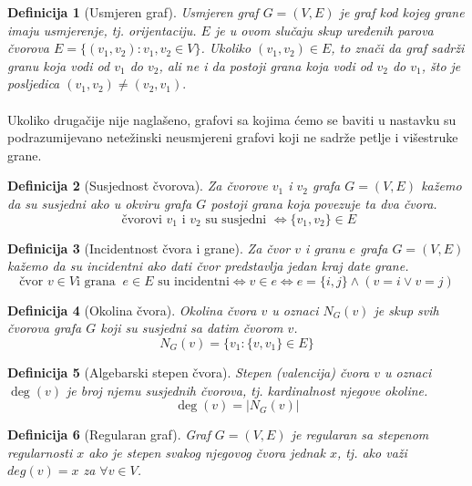 \documentclass[11pt]{article}
\newtheorem{definition}{Definicija}
\begin{document}
		\begin{definition}[Usmjeren graf]
		Usmjeren graf $G =(V,E)$ je graf kod kojeg grane imaju usmjerenje, tj. orijentaciju. $E$ je u ovom slučaju skup uređenih parova čvorova $E = \{ (v_1,v_2) : v_1, v_2 \in V\}$. 
		Ukoliko $(v_1,v_2) \in E$, to znači da graf sadrži granu koja vodi od $v_1$ do $v_2$, ali ne i da postoji grana koja vodi od $v_2$ do $v_1$, što je posljedica $(v_1,v_2) \neq (v_2,v_1).$
		\end{definition}
	
		\paragraph{}
		Ukoliko drugačije nije naglašeno, grafovi sa kojima ćemo se baviti u nastavku su podrazumijevano netežinski neusmjereni grafovi koji ne sadrže petlje i višestruke grane.
	
		\begin{definition}[Susjednost čvorova]
		Za čvorove $v_1$ i $v_2$ grafa $G = (V, E)$ kažemo da su susjedni ako u okviru grafa $G$ postoji grana koja povezuje ta dva čvora. 
		\[\text{ čvorovi } v_1 \text{ i } v_2 \text{ su susjedni } \Leftrightarrow \{v_1, v_2\} \in E \]
		\end{definition}
		
		\begin{definition}[Incidentnost čvora i grane]
		Za čvor $v$ i granu $e$ grafa $G = (V, E)$ kažemo da su incidentni ako dati čvor predstavlja jedan kraj date grane.
		\[ \text{čvor } v \in V \text{i grana }\ e \in E \text{ su incidentni} \Leftrightarrow v \in e \Leftrightarrow e = \{i,j\} \land ( v = i  \lor  v = j) \] 
		\end{definition}
	
		\begin{definition}[Okolina čvora]
		Okolina čvora $v$ u oznaci $N_G(v)$ je skup svih čvorova grafa $G$ koji su susjedni sa datim čvorom $v$.
		\[N_G(v) = \{ v_1 : \{v, v_1\} \in E\}\]
		\end{definition}
	
		\begin{definition}[Algebarski stepen čvora]
		Stepen (valencija) čvora $v$ u oznaci $\deg(v)$ je broj njemu susjednih čvorova, tj. kardinalnost njegove okoline.
		\[\deg(v) = |N_G(v)|\]
		\end{definition}
		
		\begin{definition}[Regularan graf]
		Graf $G=(V,E)$ je regularan sa stepenom regularnosti $x$ ako je stepen svakog njegovog čvora jednak $x$, tj. ako važi $deg(v) = x$ za $\forall v \in V$. 
		\end{definition}
	
\end{document}

